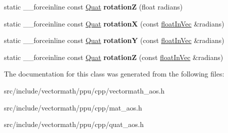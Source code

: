 \begin{DoxyCompactItemize}
\item 
\hypertarget{classVectormath_1_1Aos_1_1Quat_a6af77f56f5c6619a5d495ef14f915a9e}{static \-\_\-\-\_\-forceinline const \hyperlink{classVectormath_1_1Aos_1_1Quat}{Quat} {\bfseries rotation\-Z} (float radians)}\label{classVectormath_1_1Aos_1_1Quat_a6af77f56f5c6619a5d495ef14f915a9e}

\item 
\hypertarget{classVectormath_1_1Aos_1_1Quat_ada95a0ba49cce541911b3c0a3d137f75}{static \-\_\-\-\_\-forceinline const \hyperlink{classVectormath_1_1Aos_1_1Quat}{Quat} {\bfseries rotation\-X} (const \hyperlink{classVectormath_1_1floatInVec}{float\-In\-Vec} \&radians)}\label{classVectormath_1_1Aos_1_1Quat_ada95a0ba49cce541911b3c0a3d137f75}

\item 
\hypertarget{classVectormath_1_1Aos_1_1Quat_a6be6de87610e3297322c3a4bcb4c4646}{static \-\_\-\-\_\-forceinline const \hyperlink{classVectormath_1_1Aos_1_1Quat}{Quat} {\bfseries rotation\-Y} (const \hyperlink{classVectormath_1_1floatInVec}{float\-In\-Vec} \&radians)}\label{classVectormath_1_1Aos_1_1Quat_a6be6de87610e3297322c3a4bcb4c4646}

\item 
\hypertarget{classVectormath_1_1Aos_1_1Quat_a851b48cbf39a05c5a1a3fefa83a92e39}{static \-\_\-\-\_\-forceinline const \hyperlink{classVectormath_1_1Aos_1_1Quat}{Quat} {\bfseries rotation\-Z} (const \hyperlink{classVectormath_1_1floatInVec}{float\-In\-Vec} \&radians)}\label{classVectormath_1_1Aos_1_1Quat_a851b48cbf39a05c5a1a3fefa83a92e39}

\end{DoxyCompactItemize}


The documentation for this class was generated from the following files\-:\begin{DoxyCompactItemize}
\item 
src/include/vectormath/ppu/cpp/vectormath\-\_\-aos.\-h\item 
src/include/vectormath/ppu/cpp/mat\-\_\-aos.\-h\item 
src/include/vectormath/ppu/cpp/quat\-\_\-aos.\-h\end{DoxyCompactItemize}
